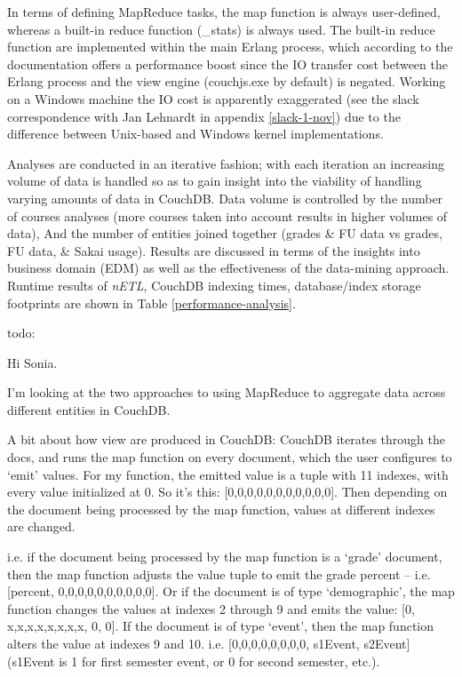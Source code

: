 In terms of defining MapReduce tasks, the map function is always user-defined, whereas a built-in reduce function (\_stats) is always used. The built-in reduce function are implemented within the main Erlang process, which according to the documentation offers a performance boost since the IO transfer cost between the Erlang process and the view engine (couchjs.exe by default) is negated. Working on a Windows machine the IO cost is apparently exaggerated (see the slack correspondence with Jan Lehnardt in appendix \ref{slack-1-nov}) due to the difference between Unix-based and Windows kernel implementations.

Analyses are conducted in an iterative fashion; with each iteration an increasing volume of data is handled so as to gain insight into the viability of handling varying amounts of data in CouchDB. Data volume is controlled by the number of courses analyses (more courses taken into account results in higher volumes of data), And the number of entities joined together (grades \& FU data vs grades, FU data, \& Sakai usage). Results are discussed in terms of the insights into business domain (EDM) as well as the effectiveness of the data-mining approach. Runtime results of \textit{nETL}, CouchDB indexing times, database/index storage footprints are shown in Table \ref{performance-analysis}.






todo:

Hi Sonia.

I’m looking at the two approaches to using MapReduce to aggregate data across different entities in CouchDB.

A bit about how view are produced in CouchDB:
CouchDB iterates through the docs, and runs the map function on every document, which the user configures to ‘emit’ values. For my function, the emitted value is a tuple with 11 indexes, with every value initialized at 0. So it’s this: [0,0,0,0,0,0,0,0,0,0,0]. Then depending on the document being processed by the map function, values at different indexes are changed.

i.e. if the document being processed by the map function is a ‘grade’ document, then the map function adjusts the value tuple to emit the grade percent – i.e. [percent, 0,0,0,0,0,0,0,0,0,0]. Or if the document is of type ‘demographic’, the map function changes the values at indexes 2 through 9 and emits the value: [0, x,x,x,x,x,x,x,x, 0, 0]. If the document is of type ‘event’, then the map function alters the value at indexes 9 and 10. i.e. [0,0,0,0,0,0,0,0, s1Event, s2Event] (s1Event is 1 for first semester event, or 0 for second semester, etc.).

